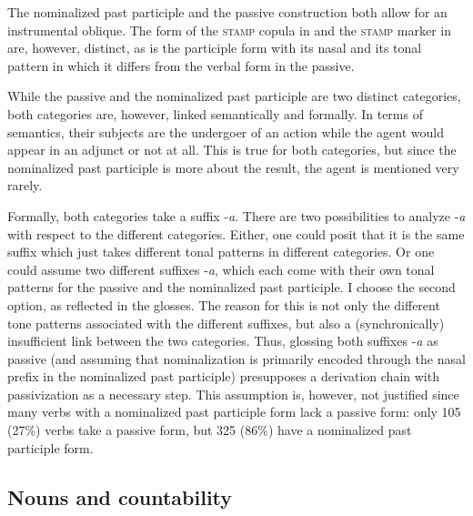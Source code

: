 The nominalized past participle and the passive construction both allow for an instrumental oblique. The form of the \textsc{stamp} copula in  and the \textsc{stamp} marker in  are, however, distinct, as is the participle form with its nasal and its tonal pattern in which it differs from the verbal form in the passive.

While  the passive and the nominalized past participle are two distinct categories, both categories are, however, linked semantically and formally. In terms of semantics, their subjects are the undergoer of an action while the agent would appear in an adjunct or not at all. This is true for both categories, but since the nominalized past participle is more about the result, the agent is mentioned very rarely.

Formally, both categories take a suffix -{\itshape a}.  There are two possibilities to analyze -{\itshape a} with respect to the different categories. Either, one could posit that it is the same suffix which just takes different tonal patterns in different categories. Or one could assume two different suffixes -{\itshape a}, which each come with their own tonal patterns for the passive and the nominalized past participle. I choose the second option, as reflected  in the glosses. The reason for this is not only the different tone patterns associated with the different suffixes, but also a (synchronically) insufficient link between the two categories. Thus, glossing both suffixes -{\itshape a} as passive (and assuming that nominalization is primarily encoded through the nasal prefix in the nominalized past participle) presupposes a derivation chain with passivization as a necessary step.  This assumption is, however, not justified since many verbs with a nominalized past participle form lack a passive form: only 105 (27\%) verbs take a passive form, but 325 (86\%) have a nominalized past participle form.

 


\subsection{Nouns and countability}
\label{sec:mass}


